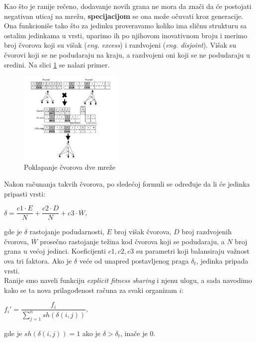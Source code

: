 \documentclass[a4paper]{article}
\begin{document}
Kao što je ranije rečeno, dodavanje novih grana ne mora da znači da će postojati negativan uticaj na mrežu, \textbf{specijacijom} se ona može očuvati kroz generacije. Ona funkcioniše tako što za jedinku proveravamo koliko ima sličnu strukturu sa ostalim jedinkama u vrsti, uparimo ih po njihovom inovativnom broju i merimo broj čvorova koji su višak (\emph{eng. excess}) i razdvojeni (\emph{eng. disjoint}). Višak su čvorovi koji se ne podudaraju na kraju, a razdvojeni oni koji se ne podudaraju u sredini. Na slici \ref{fig:genomes} se nalazi primer.

\begin{figure}[!h]
\begin{center}
\includegraphics[width=190px, keepaspectratio]{matching.png}
\end{center}
\caption{Poklapanje čvorova dve mreže}
\label{fig:genomes}
\end{figure}

Nakon računanja takvih čvorova, po sledećoj formuli se određuje da li će jedinka pripasti vrsti:

\begin{center}
$\delta = \dfrac{c1 \cdot{E}}{N} + \dfrac{c2 \cdot{D} }{N} + c3 \cdot \overline{W} $, \\
\end{center}
gde je $\delta$ rastojanje podudarnosti, $E$ broj višak čvorova, $D$ broj razdvojenih čvorova, $\overline{W}$ prosečno rastojanje težina kod čvorova koji se podudaraju, a $N$ broj grana u većoj jedinci. Koeficijenti $c1, c2, c3$ su parametri koji balansiraju važnost ova tri faktora. Ako je $\delta$ veće od unapred postavljenog praga $\delta_t$, jedinka pripada vrsti.\\
Ranije smo naveli funkciju \emph{explicit fitness sharing} i njenu ulogu, a sada navodimo kako se ta nova prilagođenost računa za svaki organizam $i$:

\begin{center}
$ f_i' = \dfrac{f_i}{ \sum_{j=1}^{n} sh(\delta(i,j)) } $, \\
\end{center}
gde je $sh(\delta(i,j))=1$ ako je $\delta > \delta_t$, inače je 0.\\
\end{document}
